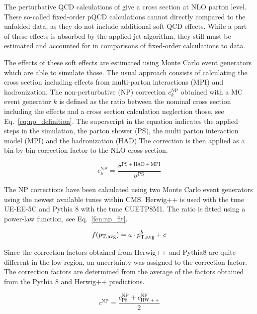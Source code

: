 The perturbative QCD calculations of \NLOJETPP give a cross section at NLO
parton level. These so-called fixed-order pQCD calculations cannot directly
compared to the unfolded data, as they do not include additional soft QCD
effects. While a part of these effects is absorbed by the applied jet-algorithm,
they still must be estimated and accounted for in comparisons of fixed-order
calculations to data.

The effects of these soft effects are estimated using Monte Carlo event
generators which are able to simulate those. The usual approach consists of
calculating the cross section including effects from multi-parton interactions
(MPI) and hadronization. The non-perturbative (NP) correction $c_k^\mathrm{NP}$
obtained with a MC event generator $k$ is defined as the ratio between the
nominal cross section including the effects and a cross section calculation
neglection those, see Eq.~\ref{eq:np_definition}. The superscript in the
equation indicates the applied steps in the simulation, the parton shower (PS),
the multi parton interaction model (MPI) and the hadronization (HAD).The
correction is then applied as a bin-by-bin correction factor to the NLO cross
section.

\begin{equation}
    c_{k}^{\mathrm{NP}} = \frac{\sigma^{\mathrm{PS+HAD+MPI}}}{\sigma^{\mathrm{PS}}}
    \label{eq:np_definition}
\end{equation}

The NP corrections have been calculated using two Monte Carlo
event generators using the newest available tunes within CMS. Herwig++ is used
with the tune UE-EE-5C and Pythia 8 with the tune CUETP8M1. The ratio is fitted
using a power-law function, see Eq.~\ref{fcn:np_fit}.

\begin{equation}
  f(p_{\mathrm{T,avg}}) = a \cdot p_{\mathrm{T,avg}}^b + c
  \label{fcn:np_fit}
\end{equation}

Since the correction factors obtained from Herwig++ and Pythia8 are quite
different in the low-\pt region, an uncertainty was assigned to the correction
factor. The correction factors are determined from the average of the factors
obtained from the Pythia 8 and Herwig++ predictions.

\begin{equation*}
    c^\mathrm{NP} = \frac{c_{\mathrm{P8}}^{\mathrm{NP}} + c_{\mathrm{HW++}}^{\mathrm{NP}}}{2}
\end{equation*}

